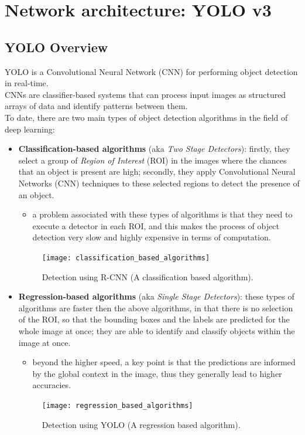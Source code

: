 \documentclass[../report.tex]{subfiles}
\begin{document}
\chapter{Network architecture: YOLO v3}\label{c:yolo-v3}

\section{YOLO Overview}\label{s:what-is-yolo}
YOLO is a Convolutional Neural Network (CNN) for performing object detection in real-time.\\
CNNs are classifier-based systems that can process input images as structured arrays of data and identify patterns between them.\\
To date, there are two main types of object detection algorithms in the field of deep learning: 
\begin{itemize}
	\item \textbf{Classification-based algorithms} (aka \textit{Two Stage Detectors}): firstly, they select a group of \textit{Region of Interest} (ROI) in the images where the chances that an object is present are high; secondly, they apply Convolutional Neural Networks (CNN) techniques to these selected regions to detect the presence of an object.
	\begin{itemize}
		\item a problem associated with these types of algorithms is that they need to execute a detector in each ROI, and this makes the process of object detection very slow and highly expensive in terms of computation.
	\end{itemize}
	\begin{figure}[H]
		\centering
		\texttt{[image: classification\_based\_algorithms]}
		\caption{Detection using R-CNN (A classification based algorithm).}\label{fig:class-algos}
	\end{figure}
	\item \textbf{Regression-based algorithms} (aka \textit{Single Stage Detectors}): these types of algorithms are faster then the above algorithms, in that there is no selection of the ROI, so that the bounding boxes and the labels are predicted for the whole image at once; they are able to identify and classify objects within the image at once.
	\begin{itemize}
		\item beyond the higher speed, a key point is that the predictions are informed by the global context in the image, thus they generally lead to higher accuracies.
	\end{itemize}
	\begin{figure}[H]
		\centering
		\texttt{[image: regression\_based\_algorithms]}
		\caption{Detection using YOLO (A regression based algorithm).}\label{fig:regr-algos}
	\end{figure}
\end{itemize}
\end{document}
